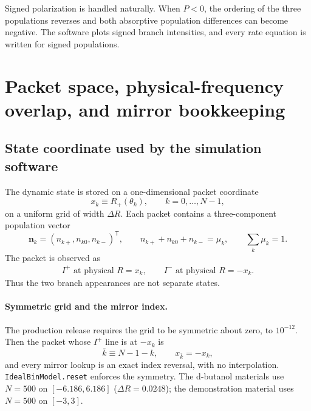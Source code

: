 \documentclass[11pt]{article}
\newcommand{\Iplus}{I^{+}}
\newcommand{\Iminus}{I^{-}}
\newcommand{\kb}{\bar{k}}
\newcommand{\code}[1]{\texttt{#1}}
\begin{document}
Signed polarization is handled naturally. When \(P<0\), the ordering of the three populations
reverses and both absorptive population differences can become negative. The software plots
signed branch intensities, and every rate equation is written for signed populations.

\section{Packet space, physical-frequency overlap, and mirror bookkeeping}
\label{sec:packets}

\subsection{State coordinate used by the simulation software}

The dynamic state is stored on a one-dimensional packet coordinate
\begin{equation}
  x_k \equiv R_{+}(\theta_k),
  \qquad k=0,\ldots,N-1,
\end{equation}
on a uniform grid of width \(\Delta R\). Each packet contains a three-component population vector
\begin{equation}
  \bm n_k=(n_{k+},n_{k0},n_{k-})^{\mathsf T},
  \qquad
  n_{k+}+n_{k0}+n_{k-}=\mu_k,
  \qquad
  \sum_k\mu_k=1.
  \label{eq:packetstate}
\end{equation}
The packet is observed as
\begin{align}
  \Iplus\text{ at physical }R=x_k,
  \qquad
  \Iminus\text{ at physical }R=-x_k.
  \label{eq:packetmirror}
\end{align}
Thus the two branch appearances are not separate states.

\paragraph{Symmetric grid and the mirror index.}
The production release requires the grid to be symmetric about zero, to \(10^{-12}\). Then the
packet whose \(\Iplus\) line is at \(-x_k\) is
\begin{equation}
  \kb\equiv N-1-k,\qquad x_{\kb}=-x_k,
  \label{eq:mirrorindex}
\end{equation}
and every mirror lookup is an exact index reversal, with no interpolation.
\code{IdealBinModel.reset} enforces the symmetry. The d-butanol materials use \(N=500\) on
\([-6.186,6.186]\) (\(\Delta R=0.0248\)); the demonstration material uses \(N=500\) on
\([-3,3]\).
\end{document}
